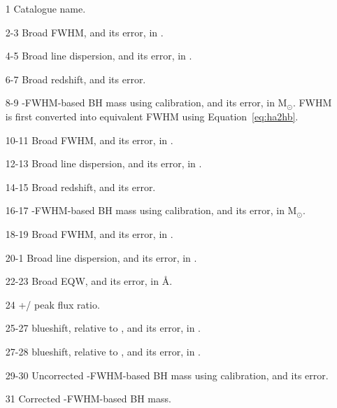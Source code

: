 \begin{itemize}

 \item[1] Catalogue name.

 \item[2-3] Broad \ha FWHM, and its error, in \kms.

 \item[4-5] Broad \ha line dispersion, and its error, in \kms.

 \item[6-7] Broad \ha redshift, and its error. 

 \item[8-9] \hans-FWHM-based BH mass using \citet{vestergaard06} calibration, and its error, in M$_\odot$. \ha FWHM is first converted into equivalent \hb FWHM using Equation~\ref{eq:ha2hb}. 

 \item[10-11] Broad \hb FWHM, and its error, in \kms.

 \item[12-13] Broad \hb line dispersion, and its error, in \kms.

 \item[14-15] Broad \hb redshift, and its error. 

 \item[16-17] \hbns-FWHM-based BH mass using \citet{vestergaard06} calibration, and its error, in M$_\odot$.  

 \item[18-19] Broad  FWHM, and its error, in \kms.

 \item[20-1] Broad  line dispersion, and its error, in \kms.

 \item[22-23] Broad  EQW, and its error, in \AA.

 \item[24] +/ peak flux ratio.

 \item[25-27]  blueshift, relative to \hans, and its error, in \kms.

 \item[27-28]  blueshift, relative to \hbns, and its error, in \kms.

 \item[29-30] Uncorrected -FWHM-based BH mass using \citet{vestergaard06} calibration, and its error.

 \item[31] Corrected -FWHM-based BH mass.

\end{itemize}


